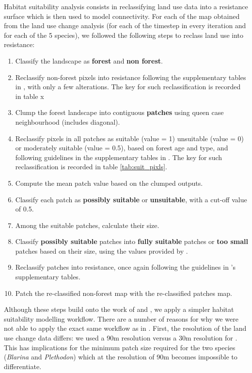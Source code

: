 Habitat suitability analysis consists in reclassifying land use data into a resistance surface which is then used to model connectivity. For each of the map obtained from the land use change analysis (for each of the timestep in every iteration and for each of the 5 species), we followed the following steps to reclass land use into resistance:
\begin{enumerate}
\item Classify the landscape as \textbf{forest} and \textbf{non forest}.
\item Reclassify non-forest pixels into resistance following the supplementary tables in  \citeauthor{rayfield_priorisation_2018}, with only a few alterations. The key for such reclassification is recorded in table {x} %
\item Clump the forest landscape into contiguous \textbf{patches} using queen case neighbourhood (includes diagonal).
\item Reclassify pixels in all patches as suitable (value = 1) unsuitable (value = 0) or moderately suitable (value = 0.5), based on forest age and type, and following guidelines in the supplementary tables in  \citeauthor{rayfield_priorisation_2018}.  The key for such reclassification is recorded in table \ref{tab:suit_pixls}.
\item  Compute the mean patch value based on the clumped outputs.
\item Classify each patch as \textbf{possibly suitable} or \textbf{unsuitable}, with a cut-off value of 0.5.
\item Among the suitable patches, calculate their size.
\item Classify \textbf{possibly suitable} patches into \textbf{fully suitable} patches or \textbf{too small} patches based on their size, using the values provided by \citeauthor{rayfield_priorisation_2018}.
\item Reclassify patches into resistance, once again following the guidelines in \citeauthor{rayfield_priorisation_2018}'s supplementary tables.
\item Patch the re-classified non-forest map with the re-classified patches map.   
\end{enumerate}

Although these steps build onto the work of \cite{albert_applying_2017} and \cite{rayfield_priorisation_2018}, we apply a simpler habitat suitability modelling workflow. There are a number of reasons for why we were not able to apply the exact same workflow as  in \citeauthor{rayfield_priorisation_2018}. First, the resolution of the land use change data differs: we used a 90m resolution versus a 30m resolution for \citeauthor{rayfield_priorisation_2018}. This has implications for the minimum patch size required for the two species (\textit{Blarina} and \textit{Plethodon}) which at the resolution of 90m becomes impossible to differentiate. 

